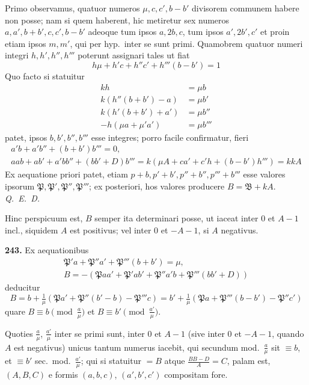 \documentclass[12pt,a4paper]{article}
\theoremstyle{plain}
\theoremstyle{definition}
\theoremstyle{remark}
\theoremstyle{problemstyle}
\begin{document}
Primo observamus, quatuor numeros $\mu, c, c', b - b'$ divisorem communem habere non posse; nam si quem haberent, hic metiretur sex numeros $a, a', b+b', c, c', b-b'$ adeoque tum ipsos $a, 2b, c$, tum ipsos $a', 2b', c'$ et proin etiam ipsos $m, m'$, qui per hyp.\ inter se sunt primi. Quamobrem quatuor numeri integri $h, h', h'', h'''$ poterunt assignari tales ut fiat
\[
h\mu + h'c + h''c' + h'''(b - b') = 1
\]
Quo facto si statuitur
\begin{align*}
kh &= \mu b \\
k(h''(b+b') - a) &= \mu b' \\
k(h'(b+b') + a') &= \mu b'' \\
-h(\mu a + \mu' a') &= \mu b'''
\end{align*}
patet, ipsos $b, b', b'', b'''$ esse integres; porro facile confirmatur, fieri
\begin{gather*}
a'b + a'b'' + (b + b')b''' = 0, \\
aab + ab' + a'bb'' + (bb' + D)b''' = k(\mu A + ca' + c'h + (b - b')h''') = kkA
\end{gather*}
Ex aequatione priori patet, etiam $p + b, p' + b', p'' + b'', p''' + b'''$ esse valores ipsorum $\mathfrak{P}, \mathfrak{P}', \mathfrak{P}'', \mathfrak{P}'''$; ex posteriori, hos valores producere $B = \mathfrak{B} + kA$. \emph{Q.\ E.\ D.}

Hinc perspicuum est, $B$ semper ita determinari posse, ut iaceat inter $0$ et $A - 1$ incl., siquidem $A$ est positivus; vel inter $0$ et $-A - 1$, si $A$ negativus.


\textbf{243.}
Ex aequationibus
\begin{gather*}
\mathfrak{P}'a + \mathfrak{P}''a' + \mathfrak{P}'''(b + b') = \mu, \\
B = -(\mathfrak{P}aa' + \mathfrak{P}'ab' + \mathfrak{P}''a'b + \mathfrak{P}'''(bb' + D))
\end{gather*}
deducitur
\[
B = b + \tfrac{1}{\mu}(\mathfrak{P}a' + \mathfrak{P}''(b' - b) - \mathfrak{P}'''c) = b' + \tfrac{1}{\mu}(\mathfrak{P}a + \mathfrak{P}'''(b - b') - \mathfrak{P}''c')
\]
quare $B \equiv b \pmod{\tfrac{a}{\mu}}$ et $B \equiv b' \pmod{\tfrac{a'}{\mu}}$.

Quoties $\tfrac{a}{\mu}$, $\tfrac{a'}{\mu}$ inter se primi sunt, inter $0$ et $A - 1$ (sive inter $0$ et $-A - 1$, quando $A$ est negativus) unicus tantum numerus iacebit, qui secundum mod.\ $\tfrac{a}{\mu}$ sit $\equiv b$, et $\equiv b'$ sec.\ mod.\ $\tfrac{a'}{\mu}$; qui si statuitur $= B$ atque $\frac{BB - D}{A} = C$, palam est, $(A, B, C)$ e formis $(a, b, c)$, $(a', b', c')$ compositam fore.
\end{document}
